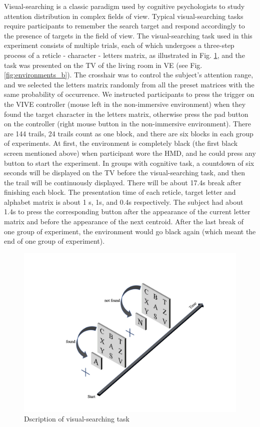 \documentclass[sigconf]{acmart}
\begin{document}
Visual-searching is a classic paradigm used by cognitive psychologists to study attention distribution in complex fields of view. Typical visual-searching tasks require participants to remember the search target and respond accordingly to the presence of targets in the field of view. The visual-searching task used in this experiment consists of multiple trials, each of which undergoes a three-step process of a reticle - character - letters matrix, as illustrated in Fig. \ref{fig:matrix}, and the task was presented on the TV of the living room in VE (see Fig. \ref{fig:environments_b}). The crosshair was to control the subject's attention range, %
and we selected the letters matrix randomly from all the preset matrices with the same probability of occurrence. We instructed participants to press the trigger on the VIVE controller (mouse left in the non-immersive environment) when they found the target character in the letters matrix,  otherwise press the pad button on the controller (right mouse button in the non-immersive environment). There are 144 trails, 24 trails count as one block, and there are six blocks in each group of experiments. At first, the environment is completely black (the first black screen mentioned above) when participant wore the HMD, and he could press any button to start the experiment. In groups with cognitive task, a countdown of six seconds will be displayed on the TV before the visual-searching task, and then the trail will be continuously displayed. There will be about 17.4s break after finishing each block. The presentation time of each reticle, target letter and alphabet matrix is about 1 s, 1s, and 0.4s respectively. The subject had about 1.4s to press the corresponding button after the appearance of the current letter matrix and before the appearance of the next centroid. After the last break of one group of experiment, the environment would go black again (which meant the end of one group of experiment).

\begin{figure}[h]
      \centering
      \includegraphics[width=\linewidth]{aaafiles/matrix}
      \caption{Dscription of visual-searching task}
      \label{fig:matrix}
\end{figure}
\end{document}
